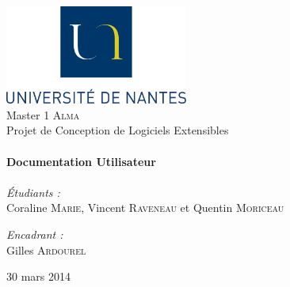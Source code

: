 
\begin{titlepage}
\begin{center}

\includegraphics[width=0.45\textwidth]{../figures/logoUN.png}~\\[2cm]

\LARGE{Master 1 \textsc{Alma}}\\[1.5cm]

\Large{Projet de Conception de Logiciels Extensibles}\\[0.5cm]

\HRule \\[0.4cm]
{ \huge \bfseries Documentation Utilisateur \\[0.4cm] }
\HRule \\[1.5cm]

\normalsize	
\emph{\'Etudiants :}\\
Coraline \textsc{Marie}, Vincent \textsc{Raveneau} et Quentin \textsc{Moriceau}

\vspace{0.5cm}

\emph{Encadrant :} \\
Gilles \textsc{Ardourel}

\vfill

{\large 30 mars 2014}

\end{center}
\end{titlepage}
